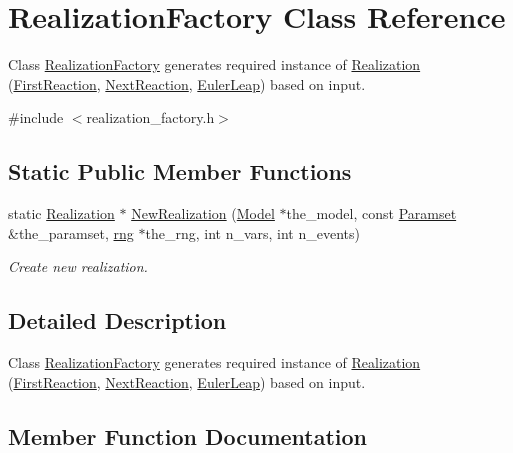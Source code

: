 \hypertarget{class_realization_factory}{}\section{Realization\+Factory Class Reference}
\label{class_realization_factory}


Class \hyperlink{class_realization_factory}{Realization\+Factory} generates required instance of \hyperlink{class_realization}{Realization} (\hyperlink{class_first_reaction}{First\+Reaction}, \hyperlink{class_next_reaction}{Next\+Reaction}, \hyperlink{class_euler_leap}{Euler\+Leap}) based on input.  




{\ttfamily \#include $<$realization\+\_\+factory.\+h$>$}

\subsection*{Static Public Member Functions}
\begin{DoxyCompactItemize}
\item 
static \hyperlink{class_realization}{Realization} $\ast$ \hyperlink{class_realization_factory_a4881816e453d1107de053ea3c0b8d8ba}{New\+Realization} (\hyperlink{class_model}{Model} $\ast$the\+\_\+model, const \hyperlink{class_paramset}{Paramset} \&the\+\_\+paramset, \hyperlink{classrng}{rng} $\ast$the\+\_\+rng, int n\+\_\+vars, int n\+\_\+events)
\begin{DoxyCompactList}\small\item\em Create new realization. \end{DoxyCompactList}\end{DoxyCompactItemize}


\subsection{Detailed Description}
Class \hyperlink{class_realization_factory}{Realization\+Factory} generates required instance of \hyperlink{class_realization}{Realization} (\hyperlink{class_first_reaction}{First\+Reaction}, \hyperlink{class_next_reaction}{Next\+Reaction}, \hyperlink{class_euler_leap}{Euler\+Leap}) based on input. 

\subsection{Member Function Documentation}
\mbox{\label{class_realization_factory_a4881816e453d1107de053ea3c0b8d8ba}} 
